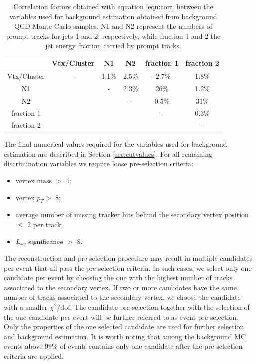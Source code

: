 \begin{table}[htbp]
\centering
\caption{Correlation factors obtained with equation \ref{eqn:corr} between the variables 
used for background estimation obtained from background QCD Monte
Carlo samples. N1 and N2 represent the numbers
of prompt tracks for jets 1 and 2, respectively, while fraction 1 and 2 the jet energy fraction carried by
prompt tracks.
\label{tab:corr}}
\begin{tabular}{c|ccccc}
 & Vtx/Cluster & N1 & N2 & fraction 1 & fraction 2 \\
\hline
Vtx/Cluster & - & 1.1\% & 2.5\% & -2.7\% & 1.8\%  \\
N1 & & - & 2.3\% & 26\%  & 1.2\% \\
N2 & & & - & 0.5\% & 31\% \\
fraction 1 & & & & - & 0.3\% \\
fraction 2 & & & & & - \\
\end{tabular}
\end{table}

The final numerical values required for the variables used for background estimation are described in Section 
\ref{sec:cutvalues}. For all remaining discrimination variables we require loose pre-selection criteria:   
\begin{itemize}
 \item vertex mass $>$ 4\GeV;
 \item vertex $p_T>$ 8\GeV;
 \item average number of missing tracker hits behind the secondary vertex position $\leq$ 2 per track;
 \item $L_{xy}$ significance $>$ 8.
\end{itemize}

The reconstruction and pre-selection procedure 
may result in multiple candidates per event that all pass
the pre-selection criteria. In such cases, we select only one candidate per event by
choosing the one with the highest number of tracks associated to the secondary vertex.
If two or more candidates have the same number of tracks associated to the secondary vertex,
we choose the candidate with a smaller $\chi^2/\text{dof}$. The candidate pre-selection together
with the selection of the 
one candidate per event will be further referred to as event pre-selection.
Only the 
properties of the one selected candidate are used for further selection and background estimation.
It is worth noting that
among the background MC events above 99\% of events contains only one candidate
after the pre-selection criteria are applied. 

